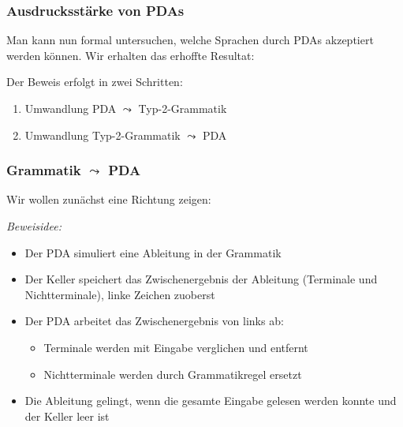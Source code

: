 \documentclass[onlymath]{beamer}
\begin{document}
\begin{frame}\frametitle{Ausdrucksstärke von PDAs}

Man kann nun formal untersuchen, welche Sprachen durch PDAs akzeptiert werden können.
Wir erhalten das erhoffte Resultat:\medskip

\pause\bigskip

Der Beweis erfolgt in zwei Schritten:
\begin{enumerate}[(1)]
\item Umwandlung PDA $\leadsto$ Typ-2-Grammatik
\item Umwandlung Typ-2-Grammatik $\leadsto$ PDA
\end{enumerate}

\end{frame}

\begin{frame}[t]\frametitle{Grammatik $\leadsto$ PDA}

Wir wollen zunächst eine Richtung zeigen:

\pause\bigskip

\emph{Beweisidee:}
\begin{itemize}
\item Der PDA simuliert eine Ableitung in der Grammatik
\item Der Keller speichert das Zwischenergebnis der Ableitung (Terminale und Nichtterminale), linke Zeichen zuoberst
\item Der PDA arbeitet das Zwischenergebnis von links ab:
\begin{itemize}
\item Terminale werden mit Eingabe verglichen und entfernt
\item Nichtterminale werden durch Grammatikregel ersetzt
\end{itemize}
\item Die Ableitung gelingt, wenn die gesamte Eingabe gelesen werden konnte und der Keller leer ist
\end{itemize}

\end{frame}
\end{document}

